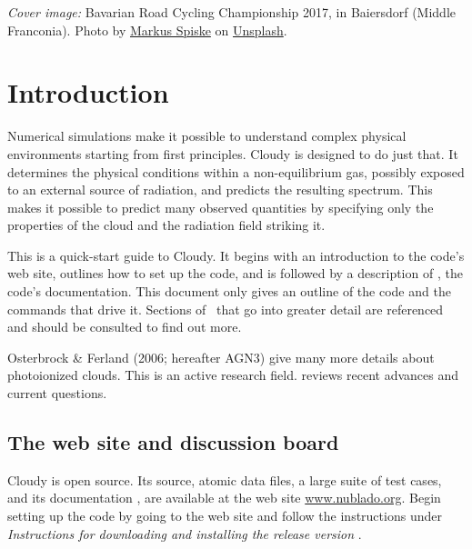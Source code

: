 \documentclass[12pt,twoside]{article}
\begin{document}
\clearpage

\vspace{5mm}
\noindent
{\small
{\em Cover image:}
Bavarian Road Cycling Championship 2017, in Baiersdorf (Middle Franconia).
Photo by
\href{https://unsplash.com/@markusspiske}{Markus Spiske} on
\href{https://unsplash.com/license}{Unsplash}.
\clearpage

\setcounter{tocdepth}{2}
\tableofcontents

\clearpage

\section{Introduction}
\label{sec:Introduction}

Numerical simulations make it
possible to understand complex physical
environments starting from first principles.  Cloudy is designed to do just
that.  It determines the physical conditions within a non-equilibrium gas,
possibly exposed to an external source of radiation, and predicts the
resulting spectrum.  This makes it possible to predict many observed
quantities by specifying only the properties of the cloud and the radiation
field striking it.

This is a quick-start guide to Cloudy.  It begins with an introduction
to the code's web site, outlines how to set up the code, and is followed
by a description of \Hazy, the code's documentation.  This document only
gives an outline of the code and the commands that drive it.  Sections of
\Hazy\ that go into greater detail are referenced and should be consulted
to find out more.

Osterbrock \& Ferland (2006; hereafter AGN3) give many more details
about photoionized clouds.
This is an active research field.
\citet{Ferland03} reviews recent advances and
current questions.

\subsection{The web site and discussion board}

Cloudy is open source.  Its source, atomic data files, a large suite
of test cases, and its documentation \Hazy, are available at the web site
\href{http://www.nublado.org}{www.nublado.org}.
Begin setting up the code by going to the
web site and
follow the instructions under
\emph{Instructions for downloading and installing the release version }.

}
\end{document}
